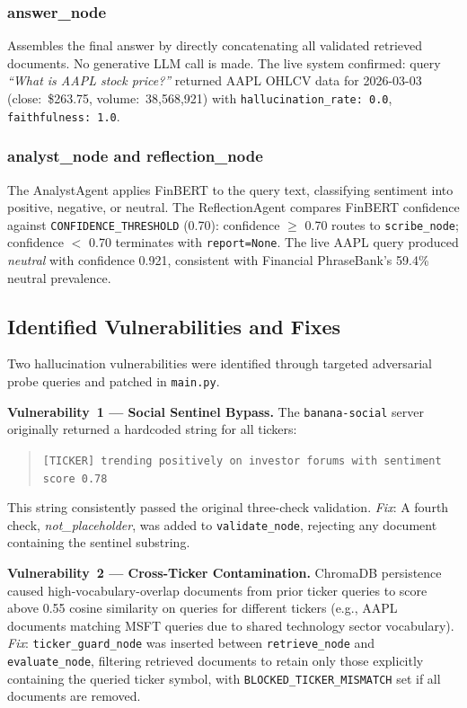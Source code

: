 \documentclass[10pt,journal,compsoc]{IEEEtran}
\newcommand{\node}[1]{\texttt{#1}}
\begin{document}
\subsubsection{answer\_node}
Assembles the final answer by directly concatenating all validated
retrieved documents.
No generative LLM call is made.
The live system confirmed: query \emph{``What is AAPL stock price?''}
returned AAPL OHLCV data for 2026-03-03 (close:~\$263.75,
volume:~38,568,921) with
\texttt{hallucination\_rate:~0.0}, \texttt{faithfulness:~1.0}.

\subsubsection{analyst\_node and reflection\_node}
The AnalystAgent applies FinBERT to the query text, classifying
sentiment into positive, negative, or neutral.
The ReflectionAgent compares FinBERT confidence against
\texttt{CONFIDENCE\_THRESHOLD} (0.70):
confidence $\geq$ 0.70 routes to \node{scribe\_node};
confidence $<$ 0.70 terminates with \texttt{report=None}.
The live AAPL query produced \emph{neutral} with confidence 0.921,
consistent with Financial PhraseBank's 59.4\% neutral prevalence.

\subsection{Identified Vulnerabilities and Fixes}

Two hallucination vulnerabilities were identified through targeted
adversarial probe queries and patched in \texttt{main.py}.

\textbf{Vulnerability~1 --- Social Sentinel Bypass.}
The \node{banana-social} server originally returned a hardcoded string
for all tickers:
\begin{quote}
\texttt{\small [TICKER] trending positively on investor forums with
sentiment score 0.78}
\end{quote}
This string consistently passed the original three-check validation.
\textit{Fix}: A fourth check, \textit{not\_placeholder}, was added to
\node{validate\_node}, rejecting any document containing the sentinel
substring.

\textbf{Vulnerability~2 --- Cross-Ticker Contamination.}
ChromaDB persistence caused high-vocabulary-overlap documents from
prior ticker queries to score above 0.55 cosine similarity on queries
for different tickers (e.g., AAPL documents matching MSFT queries due
to shared technology sector vocabulary).
\textit{Fix}: \node{ticker\_guard\_node} was inserted between
\node{retrieve\_node} and \node{evaluate\_node}, filtering retrieved
documents to retain only those explicitly containing the queried ticker
symbol, with \texttt{BLOCKED\_TICKER\_MISMATCH} set if all documents
are removed.
\end{document}
